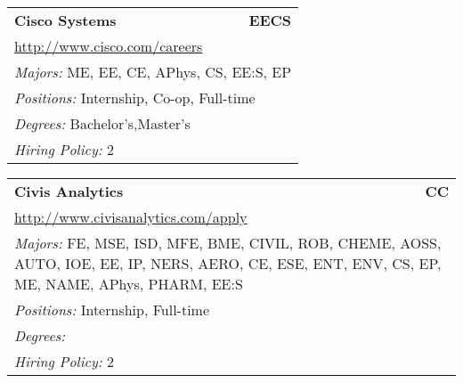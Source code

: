 \documentclass[twoside]{article}
\begin{document}
\begin{center}
\begin{multicols}{3}
\begin{FlushLeft}
\begin{minipage}{.9\columnwidth}
\end{minipage}
 
\begin{minipage}{.9\columnwidth}\begin{tabularx}{.95\columnwidth}{Xr}
                 {\Large\bf Cisco Systems} & {\Large\bf EECS}\\
    \multicolumn{2}{p{.95\columnwidth}}{\url{http://www.cisco.com/careers}}\\
    \multicolumn{2}{p{.95\columnwidth}}{\emph{Majors:} ME, EE, CE, APhys, CS, EE:S, EP}\\
    \multicolumn{2}{p{.95\columnwidth}}{\emph{Positions:} Internship, Co-op, Full-time}\\
    \multicolumn{2}{p{.95\columnwidth}}{\emph{Degrees:} Bachelor's,Master's}\\
    \multicolumn{2}{p{.95\columnwidth}}{\emph{Hiring Policy:} 2}\\
    \end{tabularx}
    
\end{minipage}
 
\begin{minipage}{.9\columnwidth}\begin{tabularx}{.95\columnwidth}{Xr}
                 {\Large\bf Civis Analytics} & {\Large\bf CC}\\
    \multicolumn{2}{p{.95\columnwidth}}{\url{http://www.civisanalytics.com/apply}}\\
    \multicolumn{2}{p{.95\columnwidth}}{\emph{Majors:} FE, MSE, ISD, MFE, BME, CIVIL, ROB, CHEME, AOSS, AUTO, IOE, EE, IP, NERS, AERO, CE, ESE, ENT, ENV, CS, EP, ME, NAME, APhys, PHARM, EE:S}\\
    \multicolumn{2}{p{.95\columnwidth}}{\emph{Positions:} Internship, Full-time}\\
    \multicolumn{2}{p{.95\columnwidth}}{\emph{Degrees:} }\\
    \multicolumn{2}{p{.95\columnwidth}}{\emph{Hiring Policy:} 2}\\
    \end{tabularx}
    
\end{minipage}
 

\end{FlushLeft}
\end{multicols}
\end{center}
\end{document}
